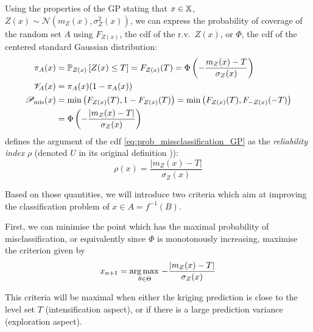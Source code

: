 \documentclass[../../Main_ManuscritThese.tex]{subfiles}
\begin{document}
Using the properties of the GP stating that $x\in\mathbb{X}$,
$Z(x)\sim\mathcal{N}\left(m_Z(x), \sigma^2_Z(x)\right)$,
we can express the probability of
coverage of the random set $A$ using $F_{Z(x)}$, the cdf of the r.v.\
$Z(x)$, or $\Phi$, the cdf of the centered standard Gaussian
distribution:
\begin{align}
  \pi_A(x) &= \mathbb{P}_{Z(x)}\left[Z(x) \leq T\right] = F_{Z(x)}(T)=\Phi\left(-\frac{m_Z(x) - T}{\sigma_Z(x)}\right) \\
  \mathscr{V}_A(x) &= \pi_A(x)(1 - \pi_A(x)) \\
  \mathscr{P}_{\mathrm{mis}}(x) &= \min\left(F_{Z(x)}(T), 1-F_{Z(x)}(T)\right)=\min\left(F_{Z(x)}(T),F_{-Z(x)}(-T)\right) \\
           &= \Phi\left(- \frac{\lvert m_Z(x) - T \rvert}{\sigma_Z(x)} \right) \label{eq:prob_missclassification_GP}
\end{align}
\cite{echard_ak-mcs_2011} defines the argument of the cdf
\cref{eq:prob_missclassification_GP} as the \emph{reliability index}
$\rho$ (denoted $U$ in its original definition
\cite{echard_ak-mcs_2011})):
\begin{equation}
  \label{eq:reliability_rho}
  \rho(x) = \frac{\lvert m_Z(x) - T \rvert}{\sigma_Z(x)}
\end{equation}

Based on those quantities, we will introduce two criteria which aim at
improving the classification problem of $x\in A=f^{-1}(B)$.

First, we can minimise the point which has the maximal probability of
misclassification, or equivalently since $\Phi$ is monotonously
increasing, maximise the criterion given by
\begin{equation} x_{n+1} =\operatorname*{arg\,max \,}_{\theta\in\Theta} -\frac{\lvert m_Z(x)- T \rvert}{\sigma_Z(x)}
\end{equation}

This criteria will be maximal when either the kriging prediction is
close to the level set $T$ (intensification aspect), or if there is a
large prediction variance (exploration aspect).
\end{document}
